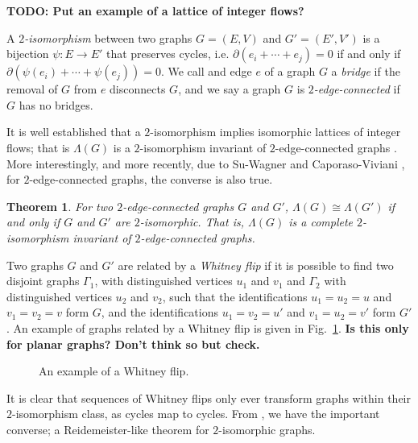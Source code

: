 \documentclass[12pt]{report}
\newcommand{\notered}[1]{{\color{Red} \textbf{#1}}}
\newcommand{\notegreen}[1]{{\color{Green} \textbf{#1}}}
\newtheorem*{theorem}{Theorem}
\begin{document}
\notegreen{TODO: Put an example of a lattice of integer flows?}

A \textit{$2$-isomorphism} between two graphs $G = (E, V)$ and $G' = (E', V')$ is a bijection \({\psi: E \longrightarrow E'}\) that preserves cycles, i.e. $\partial(e_{i} + \cdots + e_{j}) = 0$ if and only if $\partial\left(\psi(e_{i}) + \cdots + \psi(e_{j})\right) = 0$. We call and edge $e$ of a graph $G$ a \textit{bridge} if the removal of $G$ from $e$ disconnects $G$, and we say a graph $G$ is \textit{$2$-edge-connected} if $G$ has no bridges.

It is well established that a $2$-isomorphism implies isomorphic lattices of integer flows; that is $\Lambda(G)$ is a $2$-isomorphism invariant of $2$-edge-connected graphs \parencite{lattice-of-flows-cuts}. More interestingly, and more recently, due to Su-Wagner \cite[Theorem 1]{lattice-of-flows-regular-matroid} and Caporaso-Viviani \cite[Theorem 3.1.1]{torelli-for-graphs-tropical-curves}, for $2$-edge-connected graphs, the converse is also true.


\begin{theorem}
For two $2$-edge-connected graphs $G$ and $G'$, $\Lambda(G) \cong \Lambda(G')$ if and only if $G$ and $G'$ are $2$-isomorphic. That is, $\Lambda(G)$ is a complete $2$-isomorphism invariant of $2$-edge-connected graphs.
\end{theorem}

Two graphs $G$ and $G'$ are related by a \textit{Whitney flip} if it is possible to find two disjoint graphs $\Gamma_{1}$, with distinguished vertices $u_{1}$ and $v_{1}$ and $\Gamma_{2}$ with distinguished vertices $u_{2}$ and $v_{2}$, such that the identifications $u_{1} = u_{2} = u$ and $v_{1} = v_{2} = v$ form $G$, and the identifications $u_{1} = v_{2} = u'$ and $v_{1} = u_{2} = v'$ form $G'$. An example of graphs related by a Whitney flip is given in Fig.~\ref{fig:whitney_flip}. \notered{Is this only for planar graphs? Don't think so but check.}

\begin{figure}[hbt!]
	\centering
	\def\svgscale{0.5}
	
	
	\caption{An example of a Whitney flip.}
	\label{fig:whitney_flip}
\end{figure}

It is clear that sequences of Whitney flips only ever transform graphs within their $2$-isomorphism class, as cycles map to cycles. From \cite{2-isomorphic-graphs}, we have the important converse; a Reidemeister-like theorem for $2$-isomorphic graphs.
\end{document}
